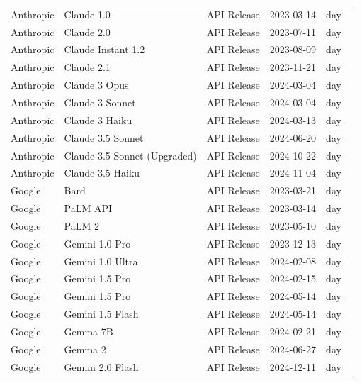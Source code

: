 \documentclass[a4paper,fleqn,longmktitle]{cas-sc}
\begin{document}
\begin{longtable}{p{2.2cm} p{3.4cm} p{3.0cm} p{2.3cm} p{1.6cm} p{2.0cm}}
Anthropic & Claude 1.0 & API Release & 2023-03-14 & day & \cite{anthropic_introducing_claude_2023} \\
Anthropic & Claude 2.0 & API Release & 2023-07-11 & day & \cite{anthropic_claude2_2023} \\
Anthropic & Claude Instant 1.2 & API Release & 2023-08-09 & day & \cite{anthropic_claude_instant_1_2_2023} \\
Anthropic & Claude 2.1 & API Release & 2023-11-21 & day & \cite{anthropic_claude2_1_2023} \\
Anthropic & Claude 3 Opus & API Release & 2024-03-04 & day & \cite{anthropic_claude3_family_2024} \\
Anthropic & Claude 3 Sonnet & API Release & 2024-03-04 & day & \cite{anthropic_claude3_family_2024} \\
Anthropic & Claude 3 Haiku & API Release & 2024-03-13 & day & \cite{anthropic_claude3_haiku_2024} \\
Anthropic & Claude 3.5 Sonnet & API Release & 2024-06-20 & day & \cite{anthropic_claude3_5_sonnet_2024} \\
Anthropic & Claude 3.5 Sonnet (Upgraded) & API Release & 2024-10-22 & day & \cite{anthropic_3_5_models_computer_use_2024} \\
Anthropic & Claude 3.5 Haiku & API Release & 2024-11-04 & day & \cite{anthropic_3_5_models_computer_use_2024} \\

Google & Bard & API Release & 2023-03-21 & day & \cite{google_bard_launch_2023} \\
Google & PaLM API & API Release & 2023-03-14 & day & \cite{google_palm_api_makersuite_2023} \\
Google & PaLM 2 & API Release & 2023-05-10 & day & \cite{google_palm2_2023} \\
Google & Gemini 1.0 Pro & API Release & 2023-12-13 & day & \cite{google_gemini_api_devs_2023} \\
Google & Gemini 1.0 Ultra & API Release & 2024-02-08 & day & \cite{google_gemini_next_era_2024} \\
Google & Gemini 1.5 Pro & API Release & 2024-02-15 & day & \cite{google_gemini_1_5_preview_2024} \\
Google & Gemini 1.5 Pro & API Release & 2024-05-14 & day & \cite{google_gemini_io_2024} \\
Google & Gemini 1.5 Flash & API Release & 2024-05-14 & day & \cite{google_gemini_io_2024} \\
Google & Gemma 7B & API Release & 2024-02-21 & day & \cite{google_gemma_open_models_2024} \\
Google & Gemma 2 & API Release & 2024-06-27 & day & \cite{google_gemma2_2024} \\
Google & Gemini 2.0 Flash & API Release & 2024-12-11 & day & \cite{deepmind_gemini_flash_2024} \\


\end{longtable}
\end{document}
